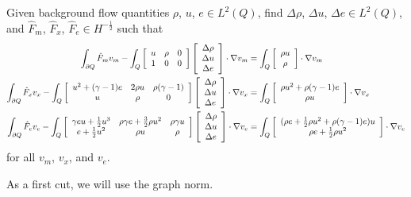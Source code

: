\documentclass{article}
\begin{document}
Given background flow quantities $\rho$, $u$, $e\in L^2(Q)$, find $\Delta\rho$, $\Delta u$, $\Delta e\in L^2(Q)$, and $\hat F_m$, $\hat
F_x$, $\hat F_e\in H^{-\frac{1}{2}}$ such that
\begin{align*}
   \int_{\partial Q}\hat F_m v_m
   -
   \int_Q
\left[
\begin{array}{ccc}
   u & \rho & 0\\
   1 & 0 & 0\\
\end{array}
\right]
\left[
\begin{array}{c}
   \Delta\rho\\
   \Delta u\\
   \Delta e\\
\end{array}
\right]\cdot\nabla v_m
&=
\int_Q
\left[
\begin{array}{c}
   \rho u\\
   \rho\\
\end{array}
\right]
\cdot\nabla v_m\\
   \int_{\partial Q}\hat F_x v_x
   -
   \int_Q
\left[
\begin{array}{ccc}
   u^2+(\gamma-1)e & 2\rho u & \rho(\gamma-1)\\
   u & \rho & 0\\
\end{array}
\right]
\left[
\begin{array}{c}
   \Delta\rho\\
   \Delta u\\
   \Delta e\\
\end{array}
\right]\cdot\nabla v_x
&=
\int_Q
\left[
\begin{array}{c}
   \rho u^2+\rho(\gamma-1)e\\
   \rho u\\
\end{array}
\right]
\cdot\nabla v_x\\
   \int_{\partial Q}\hat F_e v_e
   -
   \int_Q
\left[
\begin{array}{ccc}
   \gamma e u + \frac{1}{2}u^3 & \rho\gamma e + \frac{3}{2}\rho u^2 & \rho\gamma u\\
   e+\frac{1}{2} u^2 & \rho u & \rho\\
\end{array}
\right]
\left[
\begin{array}{c}
   \Delta\rho\\
   \Delta u\\
   \Delta e\\
\end{array}
\right]\cdot\nabla v_e
&=
\int_Q
\left[
\begin{array}{c}
   (\rho e + \frac{1}{2}\rho u^2+\rho(\gamma-1)e)u\\
   \rho e + \frac{1}{2}\rho u^2\\
\end{array}
\right]
\cdot\nabla v_e
\end{align*}
for all $v_m$, $v_x$, and $v_e$.

As a first cut, we will use the graph norm.
\end{document}
